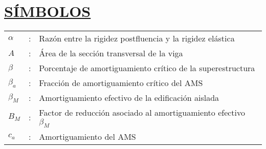 \section*{\textbf{\underline{SÍMBOLOS}}}

\begin{tabular}{L{0.5 cm}p{0.025 cm}p{12.5 cm}}
$\alpha$           & : & Razón entre la rigidez postfluencia y la   rigidez elástica \\
$A$                & : & Área de la sección transversal de la viga                                                  \\
$\beta$            & : & Porcentaje de amortiguamiento crítico de la superestructura                                \\
$\beta_{a}$        & : & Fracción de amortiguamiento crítico del AMS                                                \\
$\beta_{M}$        & : & Amortiguamiento efectivo de la edificación aislada                                         \\
$B_{M}$            & : & Factor de reducción asociado al amortiguamiento efectivo   $\beta_{M}$                     \\
$c_{a}$            & : & Amortiguamiento del AMS                                                                     
\end{tabular}





